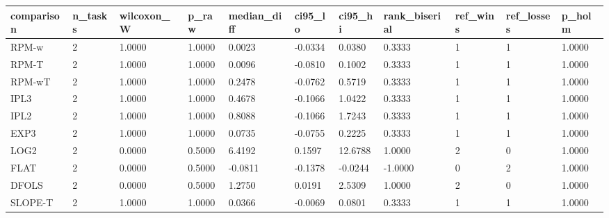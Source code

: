 \begin{tabular}{lllllllllll}
\hline
comparison & n\_tasks & wilcoxon\_W & p\_raw & median\_diff & ci95\_lo & ci95\_hi & rank\_biserial & ref\_wins & ref\_losses & p\_holm \\
\hline
RPM-w & 2 & 1.0000 & 1.0000 & 0.0023 & -0.0334 & 0.0380 & 0.3333 & 1 & 1 & 1.0000 \\
RPM-T & 2 & 1.0000 & 1.0000 & 0.0096 & -0.0810 & 0.1002 & 0.3333 & 1 & 1 & 1.0000 \\
RPM-wT & 2 & 1.0000 & 1.0000 & 0.2478 & -0.0762 & 0.5719 & 0.3333 & 1 & 1 & 1.0000 \\
IPL3 & 2 & 1.0000 & 1.0000 & 0.4678 & -0.1066 & 1.0422 & 0.3333 & 1 & 1 & 1.0000 \\
IPL2 & 2 & 1.0000 & 1.0000 & 0.8088 & -0.1066 & 1.7243 & 0.3333 & 1 & 1 & 1.0000 \\
EXP3 & 2 & 1.0000 & 1.0000 & 0.0735 & -0.0755 & 0.2225 & 0.3333 & 1 & 1 & 1.0000 \\
LOG2 & 2 & 0.0000 & 0.5000 & 6.4192 & 0.1597 & 12.6788 & 1.0000 & 2 & 0 & 1.0000 \\
FLAT & 2 & 0.0000 & 0.5000 & -0.0811 & -0.1378 & -0.0244 & -1.0000 & 0 & 2 & 1.0000 \\
DFOLS & 2 & 0.0000 & 0.5000 & 1.2750 & 0.0191 & 2.5309 & 1.0000 & 2 & 0 & 1.0000 \\
SLOPE-T & 2 & 1.0000 & 1.0000 & 0.0366 & -0.0069 & 0.0801 & 0.3333 & 1 & 1 & 1.0000 \\
\hline
\end{tabular}
